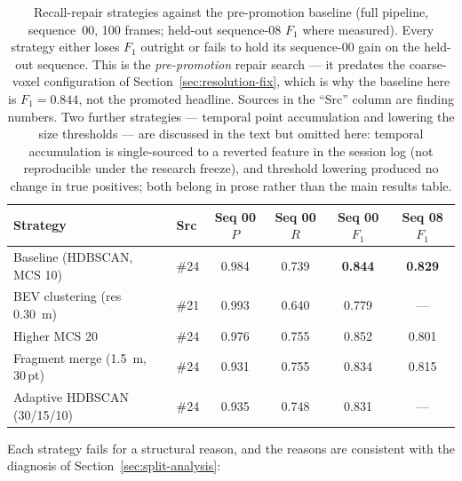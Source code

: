 \begin{table}[H]
  \centering
  \caption{Recall-repair strategies against the pre-promotion baseline (full
    pipeline, sequence~00, \num{100} frames; held-out sequence-08 $F_1$ where
    measured). Every strategy either loses $F_1$ outright or fails to hold its
    sequence-00 gain on the held-out sequence. This is the \emph{pre-promotion}
    repair search --- it predates the coarse-voxel configuration of
    Section~\ref{sec:resolution-fix}, which is why the baseline here is
    $F_1=\num{0.844}$, not the promoted headline. Sources in the ``Src'' column are
    finding numbers. Two further strategies --- temporal point accumulation and
    lowering the size thresholds --- are discussed in the text but omitted here:
    temporal accumulation is single-sourced to a reverted feature in the session
    log (not reproducible under the research freeze), and threshold lowering
    produced no change in true positives; both belong in prose rather than the main
    results table.}
  \label{tab:strategies}
  \setlength{\tabcolsep}{4pt}
  \begin{tabular}{llcccc}
    \toprule
    Strategy & Src & Seq 00 $P$ & Seq 00 $R$ & Seq 00 $F_1$ & Seq 08 $F_1$ \\
    \midrule
    Baseline (HDBSCAN, MCS \num{10}) & \#24 & 0.984 & 0.739 & \textbf{0.844} & \textbf{0.829} \\
    BEV clustering (res \SI{0.30}{\metre})   & \#21 & 0.993 & 0.640 & 0.779 & --- \\
    Higher MCS \num{20}                       & \#24 & 0.976 & 0.755 & 0.852 & 0.801 \\
    Fragment merge (\SI{1.5}{\metre}, \num{30}\,pt) & \#24 & 0.931 & 0.755 & 0.834 & 0.815 \\
    Adaptive HDBSCAN (\num{30}/\num{15}/\num{10}) & \#24 & 0.935 & 0.748 & 0.831 & --- \\
    \bottomrule
  \end{tabular}
\end{table}

Each strategy fails for a structural reason, and the reasons are consistent with the
diagnosis of Section~\ref{sec:split-analysis}:

